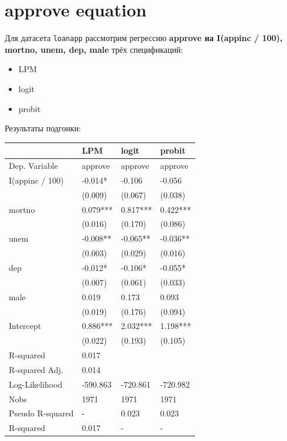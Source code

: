 \documentclass[
  russian,
]{article}
\newcounter{none} %
\providecommand{\tightlist}{%
  \setlength{\itemsep}{0pt}\setlength{\parskip}{0pt}}
\begin{document}
\section{approve equation}\label{approve-equation}

Для датасета \texttt{loanapp} рассмотрим регрессию \textbf{approve на
I(appinc / 100), mortno, unem, dep, male} трёх спецификаций:

\begin{itemize}
\tightlist
\item
  LPM
\item
  logit
\item
  probit
\end{itemize}

Результаты подгонки:

{\def\LTcaptype{none} %
\begin{longtable}[]{@{}llll@{}}
\toprule\noalign{}
& LPM & logit & probit \\
\midrule\noalign{}
\endhead
\bottomrule\noalign{}
\endlastfoot
Dep. Variable & approve & approve & approve \\
I(appinc / 100) & -0.014* & -0.106 & -0.056 \\
& (0.009) & (0.067) & (0.038) \\
mortno & 0.079*** & 0.817*** & 0.422*** \\
& (0.016) & (0.170) & (0.086) \\
unem & -0.008** & -0.065** & -0.036** \\
& (0.003) & (0.029) & (0.016) \\
dep & -0.012* & -0.106* & -0.055* \\
& (0.007) & (0.061) & (0.033) \\
male & 0.019 & 0.173 & 0.093 \\
& (0.019) & (0.176) & (0.094) \\
Intercept & 0.886*** & 2.032*** & 1.198*** \\
& (0.022) & (0.193) & (0.105) \\
R-squared & 0.017 & & \\
R-squared Adj. & 0.014 & & \\
Log-Likelihood & -590.863 & -720.861 & -720.982 \\
Nobs & 1971 & 1971 & 1971 \\
Pseudo R-squared & - & 0.023 & 0.023 \\
R-squared & 0.017 & - & - \\
\end{longtable}
}
\end{document}
